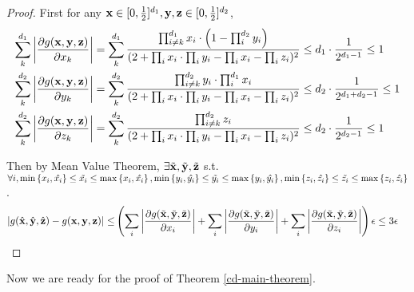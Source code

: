 	\begin{proof}
		First for any ${\bf x} \in [0, \frac{1}{2}]^{d_1} , {\bf y,z} \in [0, \frac{1}{2}]^{d_2}$,
		\begin{align*}
		\sum_k^{d_1} \left\vert \frac{\partial g({\bf x,y,z})}{\partial x_k} \right\vert &= \sum_k^{d_1} \frac{\prod_{i\neq k}^{d_1} x_i \cdot \left( 1 - \prod_i^{d_2} y_i \right)}{(2+\prod_i x_i \cdot \prod_i y_i - \prod_i x_i - \prod_i z_i)^2}
		\leq d_1\cdot  \frac{1}{2^{d_1 - 1}}  \leq 1 \\
		\sum_k^{d_2} \left\vert \frac{\partial g({\bf x,y,z})}{\partial y_k} \right\vert &= \sum_k^{d_2} \frac{\prod_{i\neq k}^{d_2} y_i \cdot \prod_{i}^{d_1} x_i}{(2+\prod_i x_i \cdot \prod_i y_i - \prod_i x_i - \prod_i z_i)^2}
		\leq d_2 \cdot \frac{1}{2^{d_1 + d_2 - 1}} \leq 1 \\
		\sum_k^{d_2} \left\vert \frac{\partial g({\bf x,y,z})}{\partial z_k} \right\vert &= \sum_k^{d_2} \frac{\prod_{i\neq k}^{d_2} z_i }{(2+\prod_i x_i \cdot \prod_i y_i - \prod_i x_i - \prod_i z_i)^2}
		\leq d_2 \cdot \frac{1}{2^{d_2 - 1}} \leq 1
		\end{align*}

		Then by Mean Value Theorem, $\exists \tilde{\bf x}, \tilde{\bf y},  \tilde{\bf z}$ s.t. $\forall i, \min\left\{x_i,\hat{x_i}\right\} \leq \tilde{x_i} \leq \max\left\{x_i, \hat{x_i}\right\}, \min\left\{y_i,\hat{y_i}\right\} \leq \tilde{y_i} \leq \max\left\{y_i, \hat{y_i}\right\}, \min\left\{z_i,\hat{z_i}\right\} \leq \tilde{z_i} \leq \max\left\{z_i, \hat{z_i}\right\}$.
		\begin{align*}
		\left\vert g(\hat{\bf x}, \hat{\bf y}, \hat{\bf z}) - g({\bf x,y,z})\right\vert \leq &
		\left(  \sum_i\left\vert \frac{\partial g(\tilde{\bf x},\tilde{\bf y},\tilde{\bf z} )}{\partial x_i}\right\vert + \sum_i\left\vert \frac{\partial g(\tilde{\bf x},\tilde{\bf y},\tilde{\bf z} )}{\partial y_i}\right\vert +  \sum_i\left\vert \frac{\partial g(\tilde{\bf x},\tilde{\bf y},\tilde{\bf z} )}{\partial z_i}\right\vert \right)  \epsilon
		\leq  3\epsilon
		\end{align*}
	\end{proof}

	Now we are ready for the proof of  Theorem \ref{cd-main-theorem}.

